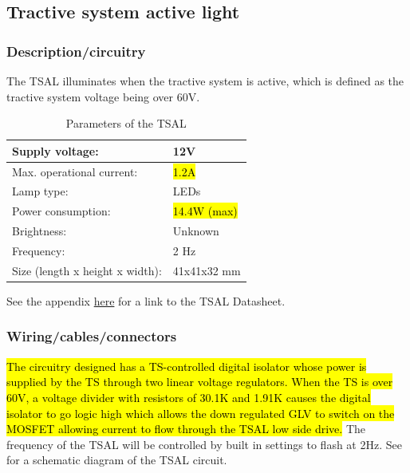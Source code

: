 \documentclass{article}
\begin{document}
\subsection{Tractive system active light}\label{tractive_system_active_light}
\subsubsection{Description/circuitry}
The TSAL illuminates when the tractive system is active, which is defined as the tractive system voltage being over 60V.

	\begin{table}[H]
	    \centering
	    \begin{tabular}{|l|l|}
	    \hline
	    Supply voltage: & 12V \\ \hline
	    Max. operational current: &  \hl{1.2A}\\ \hline
	    Lamp type: & LEDs \\ \hline
	    Power consumption: & \hl{14.4W (max)}\\ \hline
	    Brightness: & Unknown\\ \hline
	    Frequency: & 2 Hz \\ \hline
	    Size (length x height x width): & 41x41x32 mm \\ \hline
	    \end{tabular}
	    \caption{Parameters of the TSAL}
	    \label{TSALparameters}
	\end{table}
	
See the appendix \hyperlink{TSALdatasheet}{here} for a link to the TSAL Datasheet.

\subsubsection{Wiring/cables/connectors}
\hl{The circuitry designed has a TS-controlled digital isolator whose power is supplied by the TS through two linear voltage regulators. When the TS is over 60V, a voltage divider with resistors of 30.1K and 1.91K causes the digital isolator to go logic high which allows the down regulated GLV to switch on the MOSFET allowing current to flow through the TSAL low side drive.} The frequency of the TSAL will be controlled by built in settings to flash at 2Hz. See  for a schematic diagram of the TSAL circuit.
\end{document}
